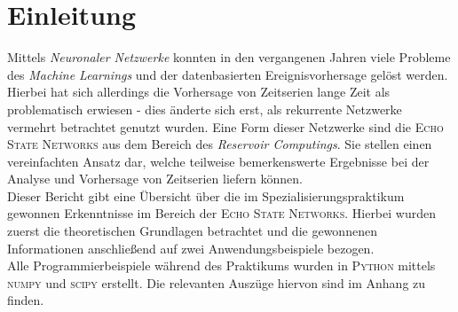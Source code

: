 \chapter{Einleitung}
Mittels \textit{Neuronaler Netzwerke} konnten in den vergangenen Jahren viele Probleme des \textit{Machine Learnings} und der datenbasierten Ereignisvorhersage gelöst werden. Hierbei hat sich allerdings die Vorhersage von Zeitserien lange Zeit als problematisch erwiesen - dies änderte sich erst, als rekurrente Netzwerke vermehrt betrachtet genutzt wurden. Eine Form dieser Netzwerke sind die \textsc{Echo State Networks} aus dem Bereich des \textit{Reservoir Computings}. Sie stellen einen vereinfachten Ansatz dar, welche teilweise bemerkenswerte Ergebnisse bei der Analyse und Vorhersage von Zeitserien liefern können.\\  

Dieser Bericht gibt eine Übersicht über die im Spezialisierungspraktikum gewonnen Erkenntnisse im Bereich der \textsc{Echo State Networks}. Hierbei wurden zuerst die theoretischen Grundlagen betrachtet und die gewonnenen Informationen anschließend auf zwei Anwendungsbeispiele bezogen.\\

Alle Programmierbeispiele während des Praktikums wurden in \textsc{Python} mittels \textsc{numpy} und \textsc{scipy} erstellt. Die relevanten Auszüge hiervon sind im Anhang zu finden.